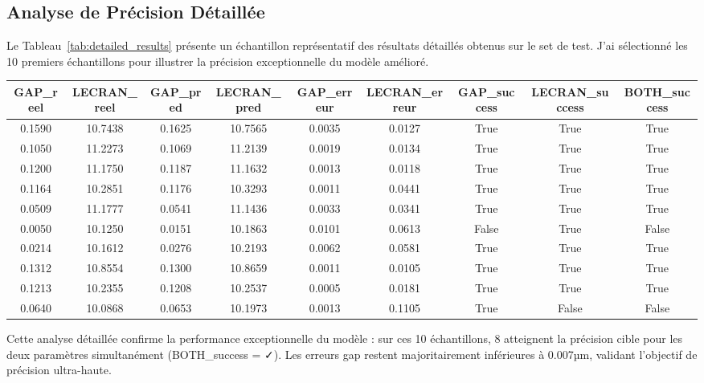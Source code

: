 \documentclass[10pt,twocolumn]{article}
\begin{document}
\subsection{Analyse de Précision Détaillée}

Le Tableau~\ref{tab:detailed_results} présente un échantillon représentatif des résultats détaillés obtenus sur le set de test. J'ai sélectionné les 10 premiers échantillons pour illustrer la précision exceptionnelle du modèle amélioré.

\begin{table*}[t]
\centering
\caption{Résultats détaillés sur échantillons de test (10 premiers échantillons)}
\label{tab:detailed_results}
\scriptsize
\begin{tabular}{|c|c|c|c|c|c|c|c|c|}
\hline
\rowcolor{lightblue}
\textbf{GAP\_reel} & \textbf{LECRAN\_reel} & \textbf{GAP\_pred} & \textbf{LECRAN\_pred} & \textbf{GAP\_erreur} & \textbf{LECRAN\_erreur} & \textbf{GAP\_success} & \textbf{LECRAN\_success} & \textbf{BOTH\_success} \\
\hline
\rowcolor{lightgray}
0.1590 & 10.7438 & 0.1625 & 10.7565 & 0.0035 & 0.0127 & True & True & True \\
\hline
0.1050 & 11.2273 & 0.1069 & 11.2139 & 0.0019 & 0.0134 & True & True & True \\
\hline
\rowcolor{lightgray}
0.1200 & 11.1750 & 0.1187 & 11.1632 & 0.0013 & 0.0118 & True & True & True \\
\hline
0.1164 & 10.2851 & 0.1176 & 10.3293 & 0.0011 & 0.0441 & True & True & True \\
\hline
\rowcolor{lightgray}
0.0509 & 11.1777 & 0.0541 & 11.1436 & 0.0033 & 0.0341 & True & True & True\\
\hline
0.0050 & 10.1250 & 0.0151 & 10.1863 & 0.0101 & 0.0613 & False & True & False \\
\hline
\rowcolor{lightgray}
0.0214 & 10.1612 & 0.0276 & 10.2193 & 0.0062 & 0.0581 & True & True & True \\
\hline
0.1312 & 10.8554 & 0.1300 & 10.8659 & 0.0011 & 0.0105 & True & True & True \\
\hline
\rowcolor{lightgray}
0.1213 & 10.2355 & 0.1208 & 10.2537 & 0.0005 & 0.0181 & True & True & True \\
\hline
0.0640 & 10.0868 & 0.0653 & 10.1973 & 0.0013 & 0.1105 & True & False & False \\
\hline
\end{tabular}
\end{table*}

Cette analyse détaillée confirme la performance exceptionnelle du modèle : sur ces 10 échantillons, 8 atteignent la précision cible pour les deux paramètres simultanément (BOTH\_success = ✓). Les erreurs gap restent majoritairement inférieures à 0.007µm, validant l'objectif de précision ultra-haute.
\end{document}
